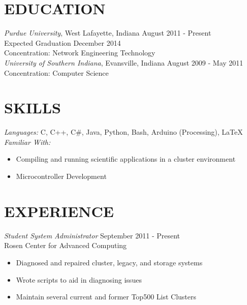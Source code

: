 \documentclass[line,margin]{res}
\begin{document}
\address{maddene@purdue.edu}
\address{maddene.com}
\address{(812) 250-1419}
 
\begin{resume}
\section{EDUCATION} 

				{\sl Purdue University}, West Lafayette, Indiana \hfill August 2011 - Present \\
                Expected Graduation December 2014 \\
                Concentration: Network Engineering Technology \\ 
                
                {\sl University of Southern Indiana}, Evansville, Indiana \hfill August 2009 - May 2011 \\
                Concentration: Computer Science\\
                
 
\section{SKILLS} 
				{\sl Languages:}  C, C++, C\#, Java, Python, Bash, Arduino (Processing), \LaTeX \\
				{\sl Familiar With:} 
                \begin{itemize}
                  \item Compiling and running scientific applications in a cluster environment
                  \item Microcontroller Development
                \end{itemize}
 
\section{EXPERIENCE} 
				{\sl Student System Administrator} \hfill September 2011 - Present \\
                Rosen Center for Advanced Computing
                \begin{itemize}  \itemsep -2pt %
                  \item Diagnosed and repaired cluster, legacy, and storage systems
                  \item Wrote scripts to aid in diagnosing issues
                  \item Maintain several current and former Top500 List Clusters
                \end{itemize}


\end{resume}
\end{document}
